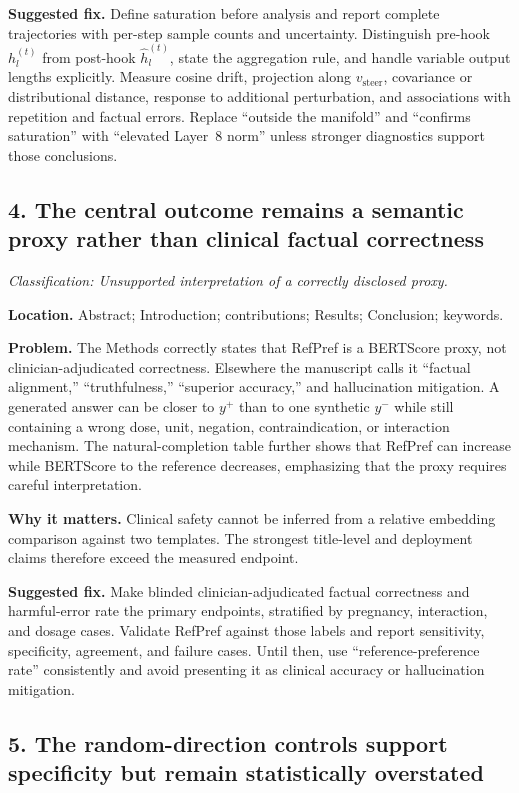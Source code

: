 \documentclass[11pt]{article}
\newcommand{\findinglabel}[1]{\textbf{#1}}
\newcommand{\classification}[1]{\textit{Classification: #1.}}
\begin{document}
\findinglabel{Suggested fix.} Define saturation before analysis and report complete trajectories with per-step sample counts and uncertainty.  Distinguish pre-hook $h_l^{(t)}$ from post-hook $\hat h_l^{(t)}$, state the aggregation rule, and handle variable output lengths explicitly.  Measure cosine drift, projection along $v_{\text{steer}}$, covariance or distributional distance, response to additional perturbation, and associations with repetition and factual errors.  Replace ``outside the manifold'' and ``confirms saturation'' with ``elevated Layer~8 norm'' unless stronger diagnostics support those conclusions.

\subsection*{4. The central outcome remains a semantic proxy rather than clinical factual correctness}

\classification{Unsupported interpretation of a correctly disclosed proxy}

\findinglabel{Location.} Abstract; Introduction; contributions; Results; Conclusion; keywords.

\findinglabel{Problem.} The Methods correctly states that RefPref is a BERTScore proxy, not clinician-adjudicated correctness.  Elsewhere the manuscript calls it ``factual alignment,'' ``truthfulness,'' ``superior accuracy,'' and hallucination mitigation.  A generated answer can be closer to $y^+$ than to one synthetic $y^-$ while still containing a wrong dose, unit, negation, contraindication, or interaction mechanism.  The natural-completion table further shows that RefPref can increase while BERTScore to the reference decreases, emphasizing that the proxy requires careful interpretation.

\findinglabel{Why it matters.} Clinical safety cannot be inferred from a relative embedding comparison against two templates.  The strongest title-level and deployment claims therefore exceed the measured endpoint.

\findinglabel{Suggested fix.} Make blinded clinician-adjudicated factual correctness and harmful-error rate the primary endpoints, stratified by pregnancy, interaction, and dosage cases.  Validate RefPref against those labels and report sensitivity, specificity, agreement, and failure cases.  Until then, use ``reference-preference rate'' consistently and avoid presenting it as clinical accuracy or hallucination mitigation.

\subsection*{5. The random-direction controls support specificity but remain statistically overstated}
\end{document}
